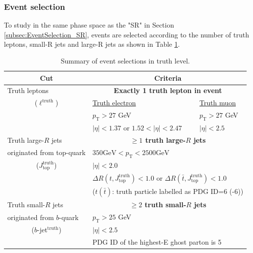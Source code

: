 \subsubsection{Event selection}
To study in the same phase space as the "SR" in Section \ref{subsec:EventSelection_SR}, events are selected according to the number of truth leptons, small-R jets and large-R jets as shown in Table \ref{tab:TruthEventSelection}.

\begin{table}[H]
  \centering
  \begin{tabular*}{150mm}{lll}
    \hline\hline
    \multicolumn{1}{c}{Cut}                               & \multicolumn{2}{c}{Criteria}\\
    \hline
    Truth leptons                                         & \multicolumn{2}{c}{\textbf{Exactly 1 truth lepton in event}}\\
    \multicolumn{1}{c}{(${\ell}^{\text{truth}}$)}         & \underline{Truth electron}          & \underline{Truth muon}\\
                                                          & $p_{\text{T}}>27$ GeV               & $p_{\text{T}}>27$ GeV\\
                                                          & $|\eta|<1.37$ or $1.52<|\eta|<2.47$ & $|\eta|<2.5$\\
    \hline
    Truth large-$R$ jets                                  & \multicolumn{2}{c}{\textbf{${\geq}1$ truth large-$R$ jets}}\\
    originated from top-quark                             & \multicolumn{2}{l}{$350\text{GeV}<p_{\text{T}}<2500\text{GeV}$}\\
    \multicolumn{1}{c}{($J_{\text{top}}^{\text{truth}}$)} & \multicolumn{2}{l}{$|\eta|<2.0$}\\
                                                          & \multicolumn{2}{l}{${\Delta}R(t, J_{\text{top}}^{\text{truth}})<1.0$ or ${\Delta}R(\bar{t}, J_{\text{top}}^{\text{truth}})<1.0$}\\
                                                          & \multicolumn{2}{l}{($t (\bar{t})$: truth particle labelled as PDG ID=6 (-6))}\\
    \hline
    Truth small-$R$ jets                                  & \multicolumn{2}{c}{\textbf{${\geq}2$ truth small-$R$ jets}}\\
    originated from $b$-quark                             & \multicolumn{2}{l}{$p_{\text{T}}>25$ GeV}\\
    \multicolumn{1}{c}{($b$-jet$^{\text{truth}}$)}        & \multicolumn{2}{l}{$|\eta|<2.5$}\\
                                                          & \multicolumn{2}{l}{PDG ID of the highest-E ghost parton is 5}\\
    \hline\hline
  \end{tabular*}
  \caption{Summary of event selections in truth level.}
  \label{tab:TruthEventSelection}
\end{table}


